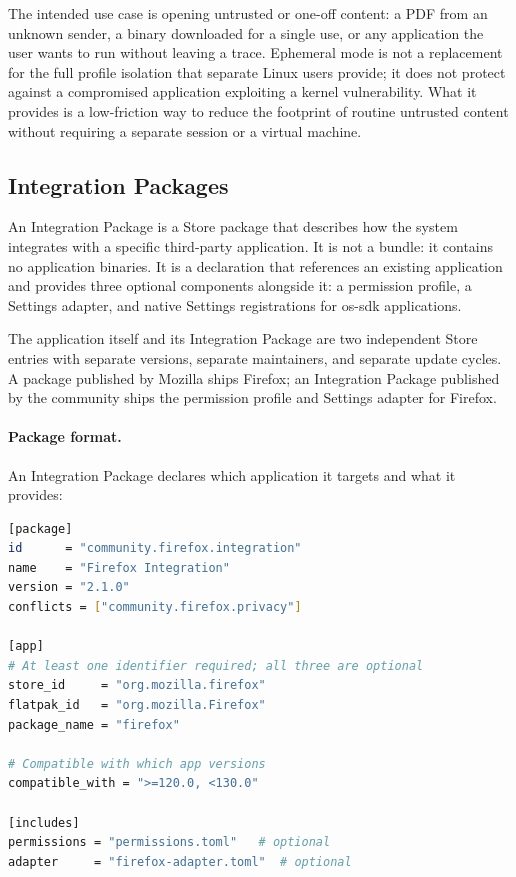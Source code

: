 The intended use case is opening untrusted or one-off content: a PDF from an
unknown sender, a binary downloaded for a single use, or any application the
user wants to run without leaving a trace. Ephemeral mode is not a replacement
for the full profile isolation that separate Linux users provide; it does not
protect against a compromised application exploiting a kernel vulnerability.
What it provides is a low-friction way to reduce the footprint of routine
untrusted content without requiring a separate session or a virtual machine.

\subsection{Integration Packages}
\label{sec:integration-packages}

An Integration Package is a Store package that describes how the system
integrates with a specific third-party application. It is not a bundle: it
contains no application binaries. It is a declaration that references an
existing application and provides three optional components alongside it:
a permission profile, a Settings adapter, and native Settings registrations
for os-sdk applications.

The application itself and its Integration Package are two independent Store
entries with separate versions, separate maintainers, and separate update
cycles. A package published by Mozilla ships Firefox; an Integration Package
published by the community ships the permission profile and Settings adapter
for Firefox.

\paragraph{Package format.}
An Integration Package declares which application it targets and what it
provides:

\begin{lstlisting}[language=bash, caption={Integration Package manifest}]
[package]
id      = "community.firefox.integration"
name    = "Firefox Integration"
version = "2.1.0"
conflicts = ["community.firefox.privacy"]

[app]
# At least one identifier required; all three are optional
store_id     = "org.mozilla.firefox"
flatpak_id   = "org.mozilla.Firefox"
package_name = "firefox"

# Compatible with which app versions
compatible_with = ">=120.0, <130.0"

[includes]
permissions = "permissions.toml"   # optional
adapter     = "firefox-adapter.toml"  # optional
\end{lstlisting}

